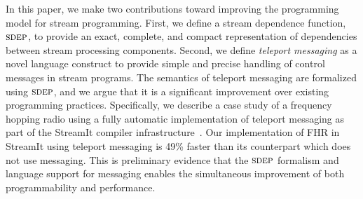 In  this  paper,  we  make  two contributions  toward  improving  the
programming model  for stream programming.  First, we  define a stream
dependence function, $\textsc{sdep}$,
to  provide   an  exact,  complete,  and   compact  representation  of
dependencies between stream processing components.
Second,  we define  {\it  teleport messaging}  as a  novel language
construct  to provide  simple  and precise  handling of control
messages in stream
programs.
The semantics of teleport  messaging are formalized using $\textsc{sdep}$, and
we argue  that it is  a  significant  improvement  over  existing
programming practices. Specifically, we describe a case study of
a frequency  hopping radio using  a fully automatic  implementation of
teleport messaging  as   part  of   the   StreamIt   compiler
infrastructure~\cite{streamit-asplos,  streamitcc}. Our implementation
of FHR  in StreamIt using teleport  messaging is 49\%  faster than its
counterpart which does not use messaging. This is preliminary evidence
that
the $\textsc{sdep}$  formalism and language support for  messaging enables the
simultaneous improvement of both programmability and performance.

